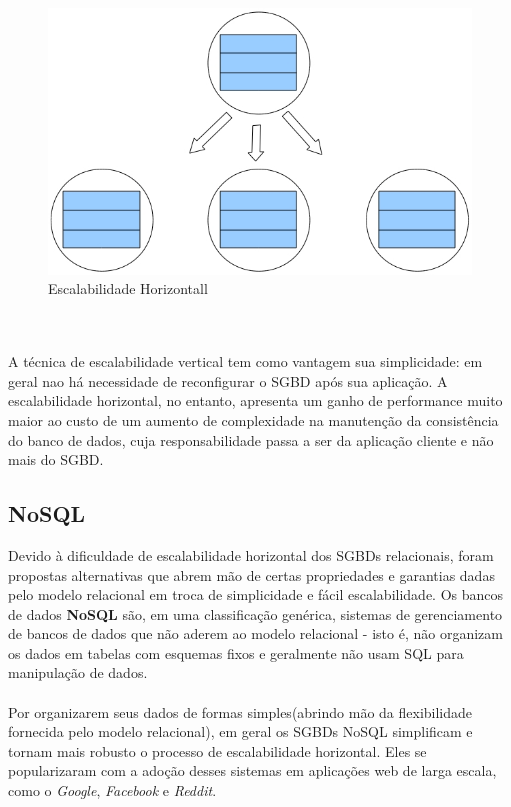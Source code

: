 \begin{figure}[h]
	\centering
	\includegraphics[scale=0.30]{figuras/horz_scaling.jpg}
    \caption{Escalabilidade Horizontall}
\end{figure}
\\\\
	A técnica de escalabilidade vertical tem como vantagem sua simplicidade: em geral nao há necessidade de reconfigurar o SGBD após sua aplicação. A escalabilidade horizontal, no entanto, apresenta um ganho de performance muito maior ao custo de um aumento de complexidade na manutenção da consistência do banco de dados, cuja responsabilidade passa a ser da aplicação cliente e não mais do SGBD.
	
\subsection{NoSQL}
	Devido à dificuldade de escalabilidade horizontal dos SGBDs relacionais, foram propostas alternativas que abrem mão de certas propriedades e garantias dadas pelo modelo relacional em troca de simplicidade e fácil escalabilidade. Os bancos de dados \textbf{NoSQL} são, em uma classificação genérica, sistemas de gerenciamento de bancos de dados que não aderem ao modelo relacional - isto é, não organizam os dados em tabelas com esquemas fixos e geralmente não usam SQL para manipulação de dados\cite{wikiNoSql}.\\\\
	Por organizarem seus dados de formas simples(abrindo mão da flexibilidade fornecida pelo modelo relacional), em geral os SGBDs NoSQL simplificam e tornam mais robusto o processo de escalabilidade horizontal\cite{IntNoSQL1}. Eles se popularizaram com a adoção desses sistemas em aplicações web de larga escala, como o \textit{Google}, \textit{Facebook} e \textit{Reddit}.
	
